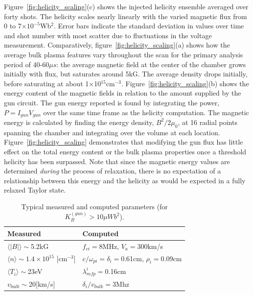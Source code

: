 \documentclass[aps,prl,amsmath,amssymb,reprint,superscriptaddress]{revtex4-1} %
\begin{document}
Figure~\ref{fig:helicity_scaling}(c) shows the injected helicity ensemble averaged over forty shots. The helicity scales nearly linearly with the varied magnetic flux from 0 to 7$\times 10^{-5}$Wb$^2$. Error bars indicate the standard deviation in values over time and shot number with most scatter due to fluctuations in the voltage measurement. Comparatively, figure~\ref{fig:helicity_scaling}(a) shows how the average bulk plasma features vary throughout the scan for the primary analysis period of 40-60$\mu s$: the average magnetic field at the center of the chamber grows initially with flux, but saturates around 5kG. The average density drops initially, before saturating at about 1$\times$10$^{15}$cm$^{-3}$. Figure~\ref{fig:helicity_scaling}(b) shows the energy content of the magnetic fields in relation to the amount supplied by the gun circuit. The gun energy reported is found by integrating the power, $P = I_{gun}V_{gun}$ over the same time frame as the helicity computation. The magnetic energy is calculated by finding the energy density, $B^{2}/2\mu_{0}$, at 16 radial points spanning the chamber and integrating over the volume at each location. Figure~\ref{fig:helicity_scaling} demonstrates that modifying the gun flux has little effect on the total energy content or the bulk plasma properties once a threshold helicity has been surpassed. Note that since the magnetic energy values are determined {\it during} the process of relaxation, there is no expectation of a relationship between this energy and the helicity as would be expected in a fully relaxed Taylor state.



\begin{table}
\caption{\label{tab:params}Typical measured and computed parameters (for $K_{B}^{(gun)}>10\mu Wb^{2}$).}
\begin{tabular}{|l|l|}
\hline
Measured&Computed\\
\hline
$\langle |B|\rangle \sim $5.2kG&$f_{ci} = $8MHz, $V_{a} = $300km/s\\
$\langle n\rangle \sim 1.4\times 10^{15}$ [cm$^{-3}$]&$c/\omega_{pi} = \delta_{i} = $0.61cm, $\rho_{i} = $0.09cm\\
$\langle T_{i}\rangle \sim $23eV&$\lambda_{mfp}^{i} = $0.16cm\\
$v_{bulk} \sim $20[km/s]&$\delta_{i}/v_{bulk} = $3Mhz \\
\hline
\end{tabular}
\end{table}
\end{document}
